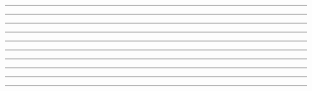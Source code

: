 \documentclass[11pt]{article}
\begin{document}
\par\nointerlineskip\noindent\hspace*{16.54mm}\rule{155.47mm}{0.4pt}\par\nointerlineskip
\par\nointerlineskip\noindent\hspace*{16.54mm}\rule{.4pt}{4.35mm}\hspace{1.2pt}\rule{.4pt}{4.35mm}\hspace{0.0mm}\hspace{35.8mm}\hspace{0.0mm}\rule{.4pt}{4.35mm}\hspace{0.0mm}\hspace{23.53mm}\hspace{0.0mm}\rule{.4pt}{4.35mm}\hspace{0.0mm}\hspace{23.48mm}\hspace{0.0mm}\rule{.4pt}{4.35mm}\hspace{0.0mm}\hspace{23.57mm}\hspace{0.0mm}\rule{.4pt}{4.35mm}\hspace{0.0mm}\hspace{23.55mm}\hspace{0.0mm}\rule{.4pt}{4.35mm}\hspace{0.0mm}\hspace{23.43mm}\hspace{0.0mm}\rule{.4pt}{4.35mm}\hspace{1.2pt}\rule{.4pt}{4.35mm}\par\nointerlineskip
\end{document}
